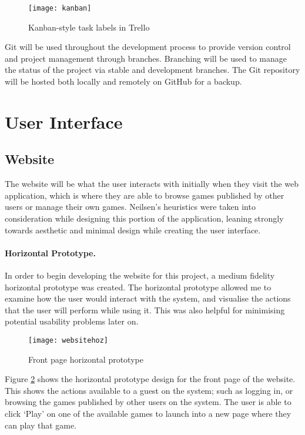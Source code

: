 \begin{figure}[h]
	\centering
	\texttt{[image: kanban]}
	\caption{Kanban-style task labels in Trello}
	\label{fig:kanban}
\end{figure}

Git will be used throughout the development process to provide version control and project management through branches. Branching will be used to manage the status of the project via stable and development branches. The Git repository will be hosted both locally and remotely on GitHub for a backup.

\section{User Interface}
	\subsection{Website}
	The website will be what the user interacts with initially when they visit the web application, which is where they are able to browse games published by other users or manage their own games. Neilsen's heuristics were taken into consideration while designing this portion of the application, leaning strongly towards aesthetic and minimal design while creating the user interface.


	\paragraph{Horizontal Prototype.}
	In order to begin developing the website for this project, a medium fidelity horizontal prototype was created. The horizontal prototype allowed me to examine how the user would interact with the system, and visualise the actions that the user will perform while using it. This was also helpful for minimising potential usability problems later on.

	\begin{figure}[h]
		\centering
		\texttt{[image: websitehoz]}
		\caption{Front page horizontal prototype}
		\label{fig:frontpageprototype}
	\end{figure}

	Figure \ref{fig:frontpageprototype} shows the horizontal prototype design for the front page of the website. This shows the actions available to a guest on the system; such as logging in, or browsing the games published by other users on the system. The user is able to click `Play' on one of the available games to launch into a new page where they can play that game.

